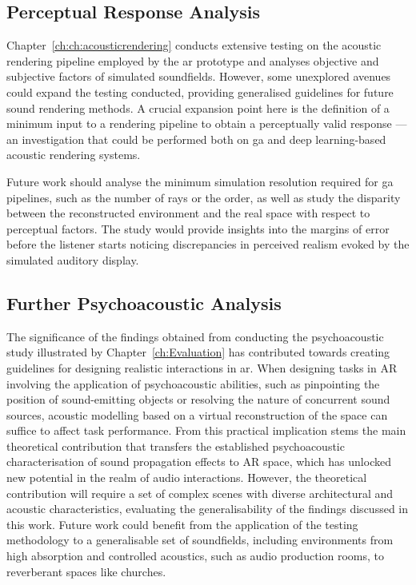 \subsection{Perceptual Response Analysis}
Chapter~\ref{ch:ch:acousticrendering} conducts extensive testing on the acoustic rendering pipeline employed by the \acrshort{ar} prototype and analyses objective and subjective factors of simulated soundfields. However, some unexplored avenues could expand the testing conducted, providing generalised guidelines for future sound rendering methods. A crucial expansion point here is the definition of a minimum input to a rendering pipeline to obtain a perceptually valid response --- an investigation that could be performed both on \acrshort{ga} and deep learning-based acoustic rendering systems.\par
Future work should analyse the minimum simulation resolution required for \acrshort{ga} pipelines, such as the number of rays or the order, as well as study the disparity between the reconstructed environment and the real space with respect to perceptual factors. The study would provide insights into the margins of error before the listener starts noticing discrepancies in perceived realism evoked by the simulated auditory display.\par

\subsection{Further Psychoacoustic Analysis}
The significance of the findings obtained from conducting the psychoacoustic study illustrated by Chapter~\ref{ch:Evaluation} has contributed towards creating guidelines for designing realistic interactions in \acrshort{ar}. When designing tasks in AR involving the application of psychoacoustic abilities, such as pinpointing the position of sound-emitting objects or resolving the nature of concurrent sound sources, acoustic modelling based on a virtual reconstruction of the space can suffice to affect task performance. From this practical implication stems the main theoretical contribution that transfers the established psychoacoustic characterisation of sound propagation effects to AR space, which has unlocked new potential in the realm of audio interactions. However, the theoretical contribution will require a set of complex scenes with diverse architectural and acoustic characteristics, evaluating the generalisability of the findings discussed in this work. Future work could benefit from the application of the testing methodology to a generalisable set of soundfields, including environments from high absorption and controlled acoustics, such as audio production rooms, to reverberant spaces like churches.\par


